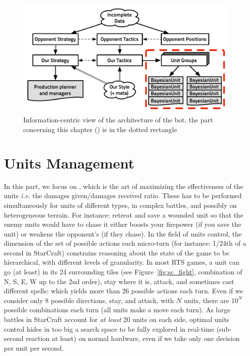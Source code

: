 \begin{figure}[!ht]
\begin{center}
\includegraphics[width=13cm]{images/starcraft_bbq_concept_MICRO.pdf}
\end{center}
\caption{Information-centric view of the architecture of the bot, the part concerning this chapter () is in the dotted rectangle}
\label{fig:conceptMICRO}
\end{figure}

\section{Units Management}
In this part, we focus on , which is the art of maximizing the effectiveness of the units \textit{i.e.} the damages given/damages received ratio. These has to be performed simultaneously for units of different types, in complex battles, and possibly on heterogeneous terrain. 
For instance: retreat and save a wounded unit so that the enemy units would have to chase it either boosts your firepower (if you save the unit) or weakens the opponent's (if they chase). 
In the field of units control, the dimension of the set of possible actions each micro-turn (for instance: 1/24th of a second in StarCraft) constrains reasoning about the state of the game to be hierarchical, with different levels of granularity. In most RTS games, a unit can go (at least) in its 24 surrounding tiles (see Figure~\ref{fig:sc_fight}, combination of N, S, E, W up to the 2nd order), 
stay where it is, attack, and sometimes cast different spells: which yields more than 26 possible actions each turn. Even if we consider only 8 possible directions, stay, and attack, with $N$ units, there are $10^N$ possible combinations each turn (all units make a move each turn). As large battles in StarCraft account for \textit{at least} 20 units on each side, optimal units control hides in too big a search space to be fully explored in real-time (sub-second reaction at least) on normal hardware, even if we take only one decision per unit per second.

